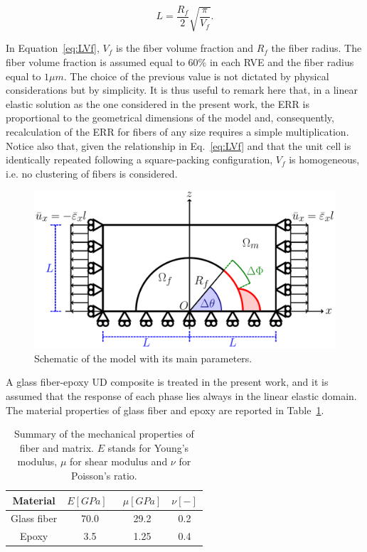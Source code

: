 \documentclass[smallextended]{svjour3}       %
\begin{document}
\begin{equation}\label{eq:LVf}
L=\frac{R_{f}}{2}\sqrt{\frac{\pi}{V_{f}}}.
\end{equation}

In Equation~\ref{eq:LVf}, $V_{f}$ is the fiber volume fraction and $R_{f}$ the fiber radius. The fiber volume fraction is assumed equal to $60\%$ in each RVE and the fiber radius equal to $1\mu m$. The choice of the previous value is not dictated by physical considerations but by simplicity. It is thus useful to remark here that, in a linear elastic solution as the one considered in the present work, the ERR is proportional to the geometrical dimensions of the model and, consequently, recalculation of the ERR for fibers of any size requires a simple multiplication. Notice also that, given the relationship in Eq.~\ref{eq:LVf} and that the unit cell is identically repeated following a square-packing configuration, $V_{f}$ is homogeneous, i.e. no clustering of fibers is considered.

\begin{figure}[!h]
\centering
\includegraphics[width=\textwidth]{RUC.pdf}
\caption{Schematic of the model with its main parameters.}\label{fig:modelschem}
\end{figure}

A glass fiber-epoxy UD composite is treated in the present work, and it is assumed that the response of each phase lies always in the linear elastic domain. The material properties of glass fiber and epoxy are reported in Table~\ref{tab:phaseprop}.

\begin{table}[!htbp]
 \centering
 \caption{Summary of the mechanical properties of fiber and matrix. $E$ stands for Young's modulus, $\mu$ for shear modulus and $\nu$ for Poisson's ratio.}
 \begin{tabular}{cccc}
\textbf{Material} & \textbf{$E\left[GPa\right]$}\ & \textbf{$\mu\left[GPa\right]$} & \textbf{$\nu\left[-\right]$} \\
\midrule
Glass fiber    & 70.0  & 29.2   & 0.2  \\
Epoxy    & 3.5    & 1.25   & 0.4
\end{tabular}
\label{tab:phaseprop}
\end{table}
\end{document}
